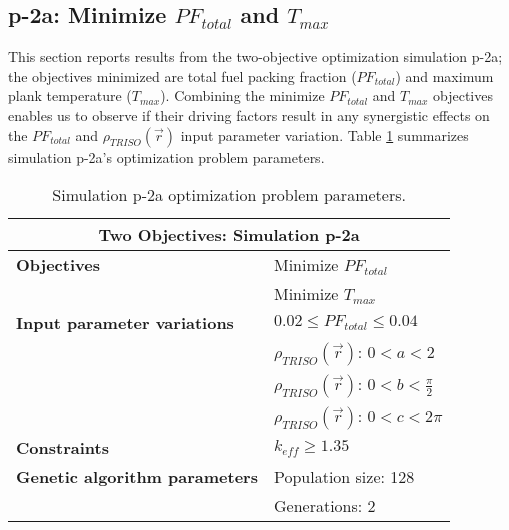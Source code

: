 \subsection{p-2a: Minimize $PF_{total}$ and $T_{max}$}
\label{sec:p-2a}
This section reports results from the two-objective optimization simulation p-2a; the 
objectives minimized are total fuel packing fraction ($PF_{total}$) and maximum plank
temperature ($T_{max}$).  
Combining the minimize $PF_{total}$ and $T_{max}$ objectives enables us to observe if 
their driving factors result in any synergistic effects on the $PF_{total}$ and 
$\rho_{TRISO}(\vec{r})$ input parameter variation. 
Table \ref{tab:simulationp2a} summarizes simulation p-2a's optimization problem parameters.
\begin{table}[htbp!]
    \centering
    \onehalfspacing
    \caption{Simulation p-2a optimization problem parameters.}
	\label{tab:simulationp2a}
    \footnotesize
    \begin{tabular}{l|p{4cm}}
    \hline 
    \multicolumn{2}{c}{\textbf{Two Objectives: Simulation p-2a}} \\
    \hline 
    \textbf{Objectives} & Minimize $PF_{total}$ \\
    & Minimize $T_{max}$ \\
    \hline 
    \textbf{Input parameter variations} & $0.02 \leq PF_{total} \leq 0.04$ \\
    & $\rho_{TRISO}(\vec{r})$: $0<a<2$ \\
    & $\rho_{TRISO}(\vec{r})$: $0<b<\frac{\pi}{2}$ \\
    & $\rho_{TRISO}(\vec{r})$: $0<c<2\pi$ \\
    \hline
    \textbf{Constraints} & $k_{eff} \geq 1.35$\\ 
    \hline 
    \textbf{Genetic algorithm parameters} & Population size: 128 \\
    & Generations: 2 \\
    \hline
    \end{tabular}
\end{table}

